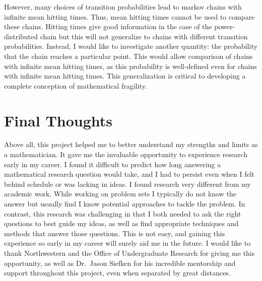 \documentclass[12pt,letterpaper]{article}
\begin{document}
However, many choices of transition probabilities lead to markov chains with infinite mean hitting
times. Thus, mean hitting times cannot be used to compare these chains. Hitting times give good
information in the case of the power-distributed chain but this will not generalize to chains with
different transition probabilities. Instead, I would like to investigate another quantity: the
probability that the chain reaches a particular point. This would allow comparison of chains with
infinite mean hitting times, as this probability is well-defined even for chains with infinite mean
hitting times. This generalization is critical to developing a complete conception of mathematical
fragility.


\section*{Final Thoughts}
Above all, this project helped me to better understand my strengths and limits as a mathematician. It
gave me the invaluable opportunity to experience research early in my career. I found it difficult to
predict how long answering a mathematical research question would take, and I had to persist even when I
felt behind schedule or was lacking in ideas. I found research very different from my academic work.
While working on problem sets I typically do not know the answer but usually find I know potential
approaches to tackle the problem. In contrast, this research was challenging in that I both needed to
ask the right questions to best guide my ideas, as well as find appropriate techniques and methods that
answer those questions. This is not easy, and gaining this experience so early in my career
will surely aid me in the future. I would like to thank Northwestern and the Office of Undergraduate
Research for giving me this opportunity, as well as Dr.~Jason Siefken for his incredible mentorship and
support throughout this project, even when separated by great distances.
\end{document}
